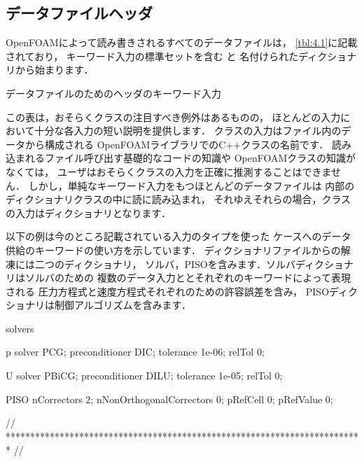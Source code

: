 \subsection{データファイルヘッダ}
\label{ssec:4.2.3}
OpenFOAMによって読み書きされるすべてのデータファイルは，
\autoref{tbl:4.1}に記載されており，
キーワード入力の標準セットを含む
%
%
と
名付けられたディクショナリから始まります．


\begin{table}[ht]
 
 \caption{データファイルのためのヘッダのキーワード入力}
 \label{tbl:4.1}
\end{table}


この表は，おそらくクラスの注目すべき例外はあるものの，
ほとんどの入力において十分な各入力の短い説明を提供します．
クラスの入力はファイル内のデータから構成される
OpenFOAMライブラリでのC++クラスの名前です．
読み込まれるファイル呼び出す基礎的なコードの知識や
OpenFOAMクラスの知識がなくては，
ユーザはおそらくクラスの入力を正確に推測することはできません．
しかし，単純なキーワード入力をもつほとんどのデータファイルは
内部のディクショナリクラスの中に読に読み込まれ，
それゆえそれらの場合，クラスの入力はディクショナリとなります．

以下の例は今のところ記載されている入力のタイプを使った
ケースへのデータ供給のキーワードの使い方を示しています．
ディクショナリファイルからの解凍には二つのディクショナリ，
ソルバ，PISOを含みます．ソルバディクショナリはソルバのための
複数のデータ入力ととそれぞれのキーワードによって表現される
圧力方程式と速度方程式それぞれのための許容誤差を含み，
PISOディクショナリは制御アルゴリズムを含みます．
\begin{OFverbatim}[file, linenum=17]

solvers
{
    p
    {
        solver           PCG;
        preconditioner   DIC;
        tolerance        1e-06;
        relTol           0;
    }

    U
    {
        solver           PBiCG;
        preconditioner   DILU;
        tolerance        1e-05;
        relTol           0;
    }
}

PISO
{
    nCorrectors     2;
    nNonOrthogonalCorrectors 0;
    pRefCell        0;
    pRefValue       0;
}


// ************************************************************************* //
\end{OFverbatim}


